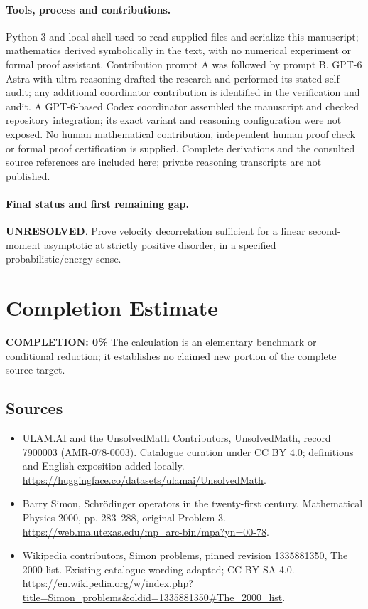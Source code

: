 \documentclass[11pt]{article}
\begin{document}
\paragraph{Tools, process and contributions.}
Python 3 and local shell used to read supplied files and serialize this manuscript; mathematics derived symbolically in the text, with no numerical experiment or formal proof assistant. Contribution prompt A was followed by prompt B. GPT-6 Astra with ultra reasoning drafted the research and performed its stated self-audit; any additional coordinator contribution is identified in the verification and audit. A GPT-6-based Codex coordinator assembled the manuscript and checked repository integration; its exact variant and reasoning configuration were not exposed. No human mathematical contribution, independent human proof check or formal proof certification is supplied. Complete derivations and the consulted source references are included here; private reasoning transcripts are not published.

\paragraph{Final status and first remaining gap.}
\textbf{UNRESOLVED}. Prove velocity decorrelation sufficient for a linear second-moment asymptotic at strictly positive disorder, in a specified probabilistic/energy sense.

\section{Completion Estimate}
\noindent\textbf{COMPLETION: 0\%}
The calculation is an elementary benchmark or conditional reduction; it establishes no claimed new portion of the complete source target.

\subsection{Sources}
\begin{itemize}
\item[\hypertarget{source:7900003:1}{S1}] ULAM.AI and the UnsolvedMath Contributors, UnsolvedMath, record 7900003 (AMR-078-0003). Catalogue curation under CC BY 4.0; definitions and English exposition added locally.
\url{https://huggingface.co/datasets/ulamai/UnsolvedMath}.
\item[\hypertarget{source:7900003:2}{S2}] Barry Simon, Schrödinger operators in the twenty-first century, Mathematical Physics 2000, pp. 283–288, original Problem 3.
\url{https://web.ma.utexas.edu/mp_arc-bin/mpa?yn=00-78}.
\item[\hypertarget{source:7900003:3}{S3}] Wikipedia contributors, Simon problems, pinned revision 1335881350, The 2000 list. Existing catalogue wording adapted; CC BY-SA 4.0.
\url{https://en.wikipedia.org/w/index.php?title=Simon_problems&oldid=1335881350#The_2000_list}.
\end{itemize}
\label{end:7900003}
\end{document}
